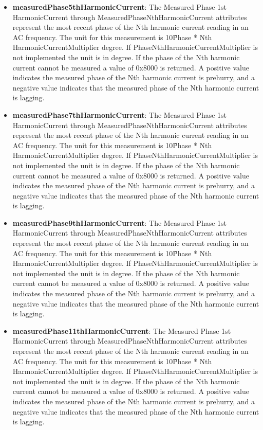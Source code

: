 \begin{itemize}
\item \textbf{measuredPhase5thHarmonicCurrent}: The Measured Phase 1st HarmonicCurrent through MeasuredPhaseNthHarmonicCurrent attributes represent the most recent phase of the Nth harmonic current reading in an AC frequency. The unit for this measurement is 10\^Phase * Nth HarmonicCurrentMultiplier degree. If PhaseNthHarmonicCurrentMultiplier is not implemented the unit is in degree. If the phase of the Nth harmonic current cannot be measured a value of 0x8000 is returned. A positive value indicates the measured phase of the Nth harmonic current is prehurry, and a negative value indicates that the measured phase of the Nth harmonic current is lagging.	
\item \textbf{measuredPhase7thHarmonicCurrent}: The Measured Phase 1st HarmonicCurrent through MeasuredPhaseNthHarmonicCurrent attributes represent the most recent phase of the Nth harmonic current reading in an AC frequency. The unit for this measurement is 10\^Phase * Nth HarmonicCurrentMultiplier degree. If PhaseNthHarmonicCurrentMultiplier is not implemented the unit is in degree. If the phase of the Nth harmonic current cannot be measured a value of 0x8000 is returned. A positive value indicates the measured phase of the Nth harmonic current is prehurry, and a negative value indicates that the measured phase of the Nth harmonic current is lagging.	
\item \textbf{measuredPhase9thHarmonicCurrent}: The Measured Phase 1st HarmonicCurrent through MeasuredPhaseNthHarmonicCurrent attributes represent the most recent phase of the Nth harmonic current reading in an AC frequency. The unit for this measurement is 10\^Phase * Nth HarmonicCurrentMultiplier degree. If PhaseNthHarmonicCurrentMultiplier is not implemented the unit is in degree. If the phase of the Nth harmonic current cannot be measured a value of 0x8000 is returned. A positive value indicates the measured phase of the Nth harmonic current is prehurry, and a negative value indicates that the measured phase of the Nth harmonic current is lagging.		
\item \textbf{measuredPhase11thHarmonicCurrent}: The Measured Phase 1st HarmonicCurrent through MeasuredPhaseNthHarmonicCurrent attributes represent the most recent phase of the Nth harmonic current reading in an AC frequency. The unit for this measurement is 10\^Phase * Nth HarmonicCurrentMultiplier degree. If PhaseNthHarmonicCurrentMultiplier is not implemented the unit is in degree. If the phase of the Nth harmonic current cannot be measured a value of 0x8000 is returned. A positive value indicates the measured phase of the Nth harmonic current is prehurry, and a negative value indicates that the measured phase of the Nth harmonic current is lagging.				

\end{itemize}
